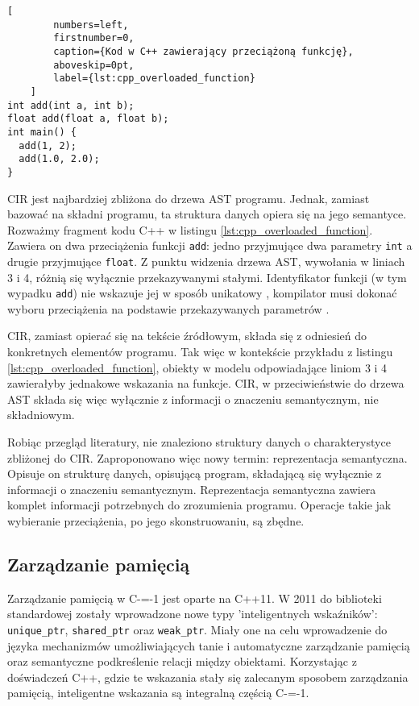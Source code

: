 \begin{minipage}{\linewidth}
	\begin{lstlisting}[
		numbers=left,
		firstnumber=0,
		caption={Kod w C++ zawierający przeciążoną funkcję},
		aboveskip=0pt,
		label={lst:cpp_overloaded_function}
	]
int add(int a, int b);
float add(float a, float b);
int main() {
  add(1, 2);
  add(1.0, 2.0);
}
	\end{lstlisting}
\end{minipage}

CIR jest najbardziej zbliżona do drzewa AST programu.
Jednak, zamiast bazować na składni programu, ta struktura danych opiera się na jego semantyce.
Rozważmy fragment kodu C++ w listingu \ref{lst:cpp_overloaded_function}.
Zawiera on dwa przeciążenia funkcji \lstinline{add}: jedno przyjmujące dwa parametry \lstinline{int} a drugie przyjmujące \lstinline{float}.
Z punktu widzenia drzewa AST, wywołania w liniach 3 i 4, różnią się wyłącznie przekazywanymi stałymi.
Identyfikator funkcji (w tym wypadku \lstinline{add}) nie wskazuje jej w sposób unikatowy \cite{ISO:cpp20}, kompilator musi dokonać wyboru przeciążenia na podstawie przekazywanych parametrów \cite{cpp:function_overload_frontend}.

CIR, zamiast opierać się na tekście źródłowym, składa się z odniesień do konkretnych elementów programu.
Tak więc w kontekście przykładu z listingu \ref{lst:cpp_overloaded_function}, obiekty w modelu odpowiadające liniom 3 i 4 zawierałyby jednakowe wskazania na funkcje.
CIR, w przeciwieństwie do drzewa AST składa się więc wyłącznie z informacji o znaczeniu semantycznym, nie składniowym.

Robiąc przegląd literatury, nie znaleziono struktury danych o charakterystyce zbliżonej do CIR.
Zaproponowano więc nowy termin: reprezentacja semantyczna.
Opisuje on strukturę danych, opisującą program, składającą się wyłącznie z informacji o znaczeniu semantycznym.
Reprezentacja semantyczna zawiera komplet informacji potrzebnych do zrozumienia programu.
Operacje takie jak wybieranie przeciążenia, po jego skonstruowaniu, są zbędne.

\subsection{Zarządzanie pamięcią}
Zarządzanie pamięcią w C-=-1 jest oparte na C++11. W 2011 do biblioteki standardowej zostały wprowadzone nowe typy 'inteligentnych wskaźników': \lstinline{unique_ptr}, \lstinline{shared_ptr} oraz \lstinline{weak_ptr}\cite{ISO:2012:III}.
Miały one na celu wprowadzenie do języka mechanizmów umożliwiających tanie i automatyczne zarządzanie pamięcią oraz semantyczne podkreślenie relacji między obiektami.
Korzystając z doświadczeń C++, gdzie te wskazania stały się zalecanym sposobem zarządzania pamięcią\cite{cpp:core_guidelines}, inteligentne wskazania są integralną częścią C-=-1.
